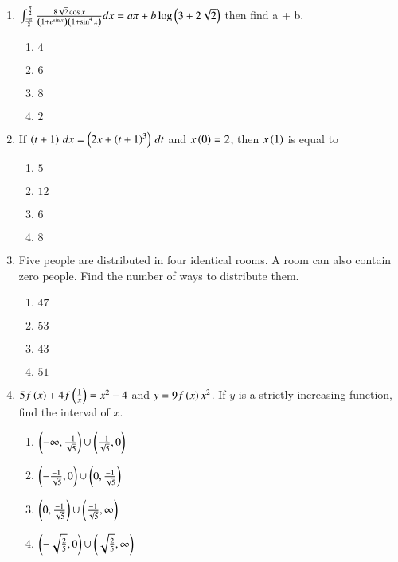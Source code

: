 \documentclass[journal,9pt,onecolumn]{IEEEtran}
\begin{document}
\begin{enumerate}
\item $\int_\frac{-\pi}{2}^\frac{\pi}{2} \frac{8\sqrt{2}\cos x}{\left(1 + e^{\sin x}\right)\left(1 + \sin^4x\right)}dx = a\pi + b\log\left(3 + 2\sqrt{2}\right)$ then find a + b.
\begin{multicols}{4}
\begin{enumerate}
    \item $4$
    \item $6$
    \item $8$
    \item $2$
\end{enumerate}
\end{multicols}


\item If $\left(t+ 1\right)\,dx = \left(2x + \left(t+ 1\right)^3\right)\,dt$ and $x\left(0\right) = 2$, then $x\left(1\right)$ is equal to
\begin{multicols}{4}
\begin{enumerate}
    \item $5$
    \item $12$
    \item $6$
    \item $8$
\end{enumerate}
\end{multicols}



\item Five people are distributed in four identical rooms. A room can also contain zero people. Find the number of ways to distribute them.
\begin{multicols}{4}
\begin{enumerate}
    \item $47$
    \item $53$
    \item $43$
    \item $51$
\end{enumerate}
\end{multicols}


\item $5f\left(x\right) + 4f\left(\frac{1}{x}\right) = x^2 -4$ and $y = 9f\left(x\right)x^2$. If $y$ is a strictly increasing function, find the interval of $x$.
\begin{multicols}{2}
\begin{enumerate}
    \item $\left( -\infty, \frac{-1}{\sqrt{5}} \right) \cup \left( \frac{-1}{\sqrt{5}}, 0 \right)$
    \item $\left(-\frac{-1}{\sqrt{5}},0\right) \cup \left(0, \frac{-1}{\sqrt{5}}\right)$
    \item $\left(0, \frac{-1}{\sqrt{5}}\right) \cup \left(\frac{-1}{\sqrt{5}},\infty\right)$
    \item $\left(-\sqrt{\frac{2}{5}}, 0\right) \cup \left(\sqrt{\frac{2}{5}}, \infty\right)$
\end{enumerate}
\end{multicols}



\end{enumerate}
\end{document}

